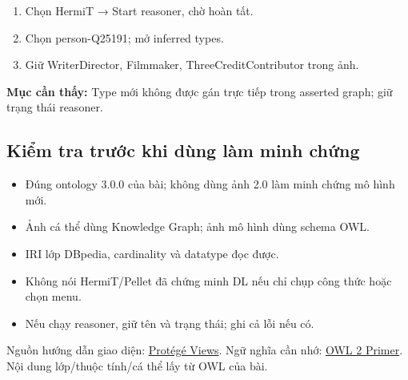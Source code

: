 \documentclass[
  11pt,
]{article}
\providecommand{\tightlist}{%
  \setlength{\itemsep}{0pt}\setlength{\parskip}{0pt}}
\begin{document}
\begin{enumerate}
\def\labelenumi{\arabic{enumi}.}
\tightlist
\item
  Chọn HermiT → Start reasoner, chờ hoàn tất.
\item
  Chọn person-\allowbreak{}\allowbreak{}Q\allowbreak{}25191; mở inferred
  types.
\item
  Giữ Writer\allowbreak{}Di\allowbreak{}rector, Filmmaker,
  Three\allowbreak{}Cre\allowbreak{}dit\allowbreak{}Contr\allowbreak{}ibutor
  trong ảnh.
\end{enumerate}

\textbf{Mục cần thấy:} Type mới không được gán trực tiếp trong asserted
graph; giữ trạng thái reasoner.

\subsection{Kiểm tra trước khi dùng làm minh
chứng}\label{kiux1ec3m-tra-trux1b0ux1edbc-khi-duxf9ng-luxe0m-minh-chux1ee9ng}

\begin{itemize}
\tightlist
\item
  Đúng ontology 3.0.0 của bài; không dùng ảnh 2.0 làm minh chứng mô hình
  mới.
\item
  Ảnh cá thể dùng Knowledge Graph; ảnh mô hình dùng schema OWL.
\item
  IRI lớp DBpedia, cardinality và datatype đọc được.
\item
  Không nói
  Hermi\allowbreak{}T/\allowbreak{}\allowbreak{}P\allowbreak{}ellet đã
  chứng minh DL nếu chỉ chụp công thức hoặc chọn menu.
\item
  Nếu chạy reasoner, giữ tên và trạng thái; ghi cả lỗi nếu có.
\end{itemize}

Nguồn hướng dẫn giao diện:
\href{https://protegeproject.github.io/protege/views/}{Protégé Views}.
Ngữ nghĩa cần nhớ: \href{https://www.w3.org/TR/owl2-primer/}{OWL 2
Primer}. Nội dung lớp/thuộc tính/cá thể lấy từ OWL của bài.
\end{document}
